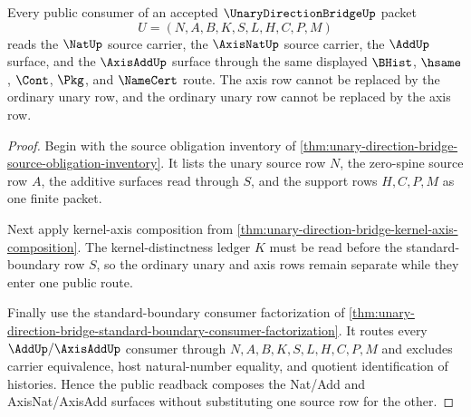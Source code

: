 \begin{theorem}
\label{thm:unary-direction-bridge-public-axis-readback}
Every public consumer of an accepted $\UnaryDirectionBridgeUp$ packet
$$
U=(N,A,B,K,S,L,H,C,P,M)
$$
reads the $\NatUp$ source carrier, the $\AxisNatUp$ source carrier, the $\AddUp$ surface, and the $\AxisAddUp$ surface through the same displayed $\BHist$, $\hsame$, $\Cont$, $\Pkg$, and $\NameCert$ route. The axis row cannot be replaced by the ordinary unary row, and the ordinary unary row cannot be replaced by the axis row.
\end{theorem}
\begin{proof}
Begin with the source obligation inventory of \autoref{thm:unary-direction-bridge-source-obligation-inventory}. It lists the unary source row $N$, the zero-spine source row $A$, the additive surfaces read through $S$, and the support rows $H,C,P,M$ as one finite packet.

Next apply kernel-axis composition from \autoref{thm:unary-direction-bridge-kernel-axis-composition}. The kernel-distinctness ledger $K$ must be read before the standard-boundary row $S$, so the ordinary unary and axis rows remain separate while they enter one public route.

Finally use the standard-boundary consumer factorization of \autoref{thm:unary-direction-bridge-standard-boundary-consumer-factorization}. It routes every $\AddUp/\AxisAddUp$ consumer through $N,A,B,K,S,L,H,C,P,M$ and excludes carrier equivalence, host natural-number equality, and quotient identification of histories. Hence the public readback composes the Nat/Add and AxisNat/AxisAdd surfaces without substituting one source row for the other.
\end{proof}

